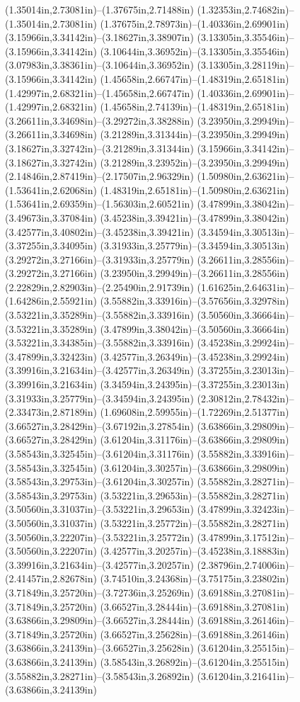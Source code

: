 (1.35014in,2.73081in)--(1.37675in,2.71488in) (1.32353in,2.74682in)--(1.35014in,2.73081in) (1.37675in,2.78973in)--(1.40336in,2.69901in) (3.15966in,3.34142in)--(3.18627in,3.38907in) (3.13305in,3.35546in)--(3.15966in,3.34142in) (3.10644in,3.36952in)--(3.13305in,3.35546in) (3.07983in,3.38361in)--(3.10644in,3.36952in) (3.13305in,3.28119in)--(3.15966in,3.34142in) (1.45658in,2.66747in)--(1.48319in,2.65181in) (1.42997in,2.68321in)--(1.45658in,2.66747in) (1.40336in,2.69901in)--(1.42997in,2.68321in) (1.45658in,2.74139in)--(1.48319in,2.65181in) (3.26611in,3.34698in)--(3.29272in,3.38288in) (3.23950in,3.29949in)--(3.26611in,3.34698in) (3.21289in,3.31344in)--(3.23950in,3.29949in) (3.18627in,3.32742in)--(3.21289in,3.31344in) (3.15966in,3.34142in)--(3.18627in,3.32742in) (3.21289in,3.23952in)--(3.23950in,3.29949in) (2.14846in,2.87419in)--(2.17507in,2.96329in) (1.50980in,2.63621in)--(1.53641in,2.62068in) (1.48319in,2.65181in)--(1.50980in,2.63621in) (1.53641in,2.69359in)--(1.56303in,2.60521in) (3.47899in,3.38042in)--(3.49673in,3.37084in) (3.45238in,3.39421in)--(3.47899in,3.38042in) (3.42577in,3.40802in)--(3.45238in,3.39421in) (3.34594in,3.30513in)--(3.37255in,3.34095in) (3.31933in,3.25779in)--(3.34594in,3.30513in) (3.29272in,3.27166in)--(3.31933in,3.25779in) (3.26611in,3.28556in)--(3.29272in,3.27166in) (3.23950in,3.29949in)--(3.26611in,3.28556in) (2.22829in,2.82903in)--(2.25490in,2.91739in) (1.61625in,2.64631in)--(1.64286in,2.55921in) (3.55882in,3.33916in)--(3.57656in,3.32978in) (3.53221in,3.35289in)--(3.55882in,3.33916in) (3.50560in,3.36664in)--(3.53221in,3.35289in) (3.47899in,3.38042in)--(3.50560in,3.36664in) (3.53221in,3.34385in)--(3.55882in,3.33916in) (3.45238in,3.29924in)--(3.47899in,3.32423in) (3.42577in,3.26349in)--(3.45238in,3.29924in) (3.39916in,3.21634in)--(3.42577in,3.26349in) (3.37255in,3.23013in)--(3.39916in,3.21634in) (3.34594in,3.24395in)--(3.37255in,3.23013in) (3.31933in,3.25779in)--(3.34594in,3.24395in) (2.30812in,2.78432in)--(2.33473in,2.87189in) (1.69608in,2.59955in)--(1.72269in,2.51377in) (3.66527in,3.28429in)--(3.67192in,3.27854in) (3.63866in,3.29809in)--(3.66527in,3.28429in) (3.61204in,3.31176in)--(3.63866in,3.29809in) (3.58543in,3.32545in)--(3.61204in,3.31176in) (3.55882in,3.33916in)--(3.58543in,3.32545in) (3.61204in,3.30257in)--(3.63866in,3.29809in) (3.58543in,3.29753in)--(3.61204in,3.30257in) (3.55882in,3.28271in)--(3.58543in,3.29753in) (3.53221in,3.29653in)--(3.55882in,3.28271in) (3.50560in,3.31037in)--(3.53221in,3.29653in) (3.47899in,3.32423in)--(3.50560in,3.31037in) (3.53221in,3.25772in)--(3.55882in,3.28271in) (3.50560in,3.22207in)--(3.53221in,3.25772in) (3.47899in,3.17512in)--(3.50560in,3.22207in) (3.42577in,3.20257in)--(3.45238in,3.18883in) (3.39916in,3.21634in)--(3.42577in,3.20257in) (2.38796in,2.74006in)--(2.41457in,2.82678in) (3.74510in,3.24368in)--(3.75175in,3.23802in) (3.71849in,3.25720in)--(3.72736in,3.25269in) (3.69188in,3.27081in)--(3.71849in,3.25720in) (3.66527in,3.28444in)--(3.69188in,3.27081in) (3.63866in,3.29809in)--(3.66527in,3.28444in) (3.69188in,3.26146in)--(3.71849in,3.25720in) (3.66527in,3.25628in)--(3.69188in,3.26146in) (3.63866in,3.24139in)--(3.66527in,3.25628in) (3.61204in,3.25515in)--(3.63866in,3.24139in) (3.58543in,3.26892in)--(3.61204in,3.25515in) (3.55882in,3.28271in)--(3.58543in,3.26892in) (3.61204in,3.21641in)--(3.63866in,3.24139in) 